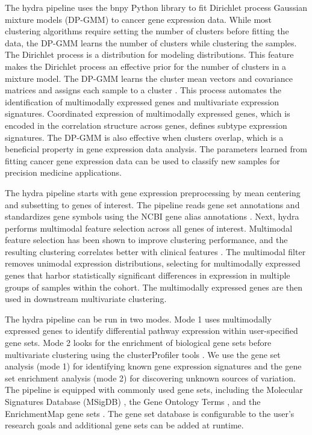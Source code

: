 \documentclass[10pt,letterpaper]{article}
\begin{document}
The hydra pipeline uses the bnpy Python library to fit Dirichlet process Gaussian mixture models (DP-GMM) to cancer gene expression data. While most clustering algorithms require setting the number of clusters before fitting the data, the DP-GMM learns the number of clusters while clustering the samples. The Dirichlet process is a distribution for modeling distributions. This feature makes the Dirichlet process an effective prior for the number of clusters in a mixture model. The DP-GMM learns the cluster mean vectors and covariance matrices and assigns each sample to a cluster \cite{hughesBnpyReliableScalable}. This process automates the identification of multimodally expressed genes and multivariate expression signatures. Coordinated expression of multimodally expressed genes, which is encoded in the correlation structure across genes, defines subtype expression signatures. The DP-GMM is also effective when clusters overlap, which is a beneficial property in gene expression data analysis. The parameters learned from fitting cancer gene expression data can be used to classify new samples for precision medicine applications.
 
The hydra pipeline starts with gene expression preprocessing by mean centering and subsetting to genes of interest. The pipeline reads gene set annotations and standardizes gene symbols using the NCBI gene alias annotations \cite{benson2012genbank}. Next, hydra performs multimodal feature selection across all genes of interest. Multimodal feature selection has been shown to improve clustering performance, and the resulting clustering correlates better with clinical features \cite{yiliMultimodalityCriterionFeature2005}. The multimodal filter removes unimodal expression distributions, selecting for multimodally expressed genes that harbor statistically significant differences in expression in multiple groups of samples within the cohort. The multimodally expressed genes are then used in downstream multivariate clustering.

The hydra pipeline can be run in two modes. Mode 1 uses multimodally expressed genes to identify differential pathway expression within user-specified gene sets. Mode 2 looks for the enrichment of biological gene sets before multivariate clustering using the clusterProfiler tools \cite{yuClusterProfilerPackageComparing2012}. We use the gene set analysis (mode 1) for identifying known gene expression signatures and the gene set enrichment analysis (mode 2) for discovering unknown sources of variation. The pipeline is equipped with commonly used gene sets, including the Molecular Signatures Database (MSigDB) \cite{liberzonMolecularSignaturesDatabase2011}, the Gene Ontology Terms \cite{ashburnerGeneOntologyTool2000, gene2018gene}, and the EnrichmentMap gene sets \cite{merico2010enrichment}. The gene set database is configurable to the user’s research goals and additional gene sets can be added at runtime.
\end{document}
